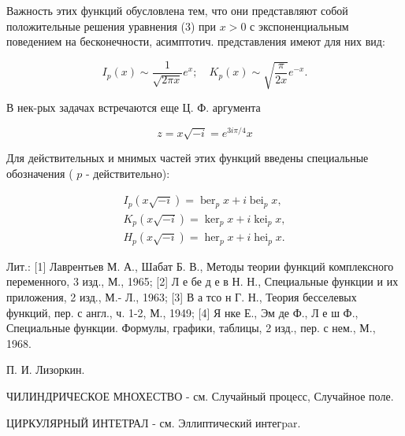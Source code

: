 \documentclass[10pt]{article}
\begin{document}
Важность этих функций обусловлена тем, что они представляют собой положительные решения уравнения (3) при $x>0$ с экспоненциальным поведением на бесконечности, асимптотич. представления имеют для них вид:



\[

I_{p}(x) \sim \frac{1}{\sqrt{2 \pi x}} e^{x} ; \quad K_{p}(x) \sim \sqrt{\frac{\pi}{2 x}} e^{-x} .

\]



В нек-рых задачах встречаются еще Ц. Ф. аргумента



\[

z=x \sqrt{-i}=e^{3 i \pi / 4} x

\]



Для действительных и мнимых частей этих функций введены специальные обозначения ( $p$ - действительно):



\[

\begin{gathered}

I_{p}(x \sqrt{-i})=\operatorname{ber}_{p} x+i \operatorname{bei}_{p} x, \\

K_{p}(x \sqrt{-i})=\operatorname{ker}_{p} x+i \operatorname{kei}_{p} x, \\

H_{p}(x \sqrt{-i})=\operatorname{her}_{p} x+i \operatorname{hei}_{p} x .

\end{gathered}

\]



Лит.: [1] Лаврентьев М. А., Шабат Б. В., Методы теории функций комплексного переменного, 3 изд., М., 1965; [2] Л е бе д е в Н. Н., Специальные функции и их приложения, 2 изд., М.- Л., 1963; [3] В а тсо н Г. Н., Теория бесселевых функций, пер. с англ., ч. 1-2, М., 1949; [4] Я нке Е., Эм де Ф., Л е ш Ф., Специальные функции. Формулы, графики, таблицы, 2 изд., пер. с нем., М., 1968.



П. И. Лизоркин.



ЧИЛИНДРИЧЕСКОЕ МНОХЕСТВО - см. Случайный процесс, Случайное поле.



ЦИРКУЛЯРНЫЙ ИНТЕТРАЛ - см. Эллиптический интегpar.
\end{document}
